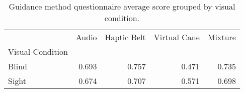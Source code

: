 
\begin{table}[!htb]
\centering
\caption{Guidance method questionnaire average score grouped by visual condition.}
\label{tab:questionnaire_average_group}
\begin{tabular}{lrrrr}
\toprule
{} &  Audio &  Haptic Belt &  Virtual Cane &  Mixture \\
Visual Condition &        &              &               &          \\
\midrule
Blind            &  0.693 &        0.757 &         0.471 &    0.735 \\
Sight            &  0.674 &        0.707 &         0.571 &    0.698 \\
\bottomrule
\end{tabular}
\end{table}

